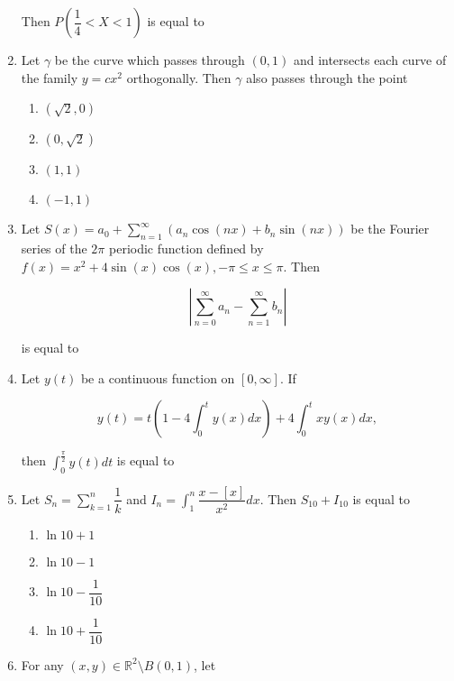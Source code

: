 \documentclass[journal]{IEEEtran}
\newcommand{\brak}[1]{\left( #1 \right)}
\newcommand{\sbrak}[1]{\left[ #1 \right]}
\newcommand{\abs}[1]{\left| #1 \right|}
\newcommand{\lt}{<}
\begin{document}
\begin{enumerate}
    Then $P\brak{\dfrac{1}{4} \lt X \lt 1}$ is equal to \underline{\hspace{2cm}}

\item Let $\gamma$ be the curve which passes through $\brak{0,1}$ and intersects each curve of the family $y = c x^2$ orthogonally. Then $\gamma$ also passes through the point

    \begin{enumerate}
        \item $\brak{\sqrt{2},0}$
        \item $\brak{0,\sqrt{2}}$
        \item $\brak{1,1}$
        \item $\brak{-1,1}$
    \end{enumerate}

\item Let $S\brak{x} = a_0 + \sum_{n=1}^{\infty}\brak{a_n \cos\brak{n x} + b_n \sin\brak{n x}}$ be the Fourier series of the $2 \pi$ periodic function defined by $f\brak{x} = x^2 + 4 \sin\brak{x} \cos\brak{x}, -\pi \le x \le \pi$. Then 

    $$\abs{\sum_{n=0}^{\infty} a_n - \sum_{n=1}^{\infty} b_n}$$

    is equal to \underline{\hspace{2cm}}

\item Let $y\brak{t}$ be a continuous function on $\sbrak{0,\infty}$. If

    $$y\brak{t} = t\brak{1 - 4\int_{0}^{t}y\brak{x}dx} + 4\int_{0}^{t}x y\brak{x}dx,$$

    then $\int_{0}^\frac{\pi}{2} y\brak{t} dt$ is equal to \underline{\hspace{2cm}}

\item Let $S_n = \sum_{k=1}^{n} \dfrac{1}{k}$ and $I_n = \int_{1}^{n} \dfrac{x - \sbrak{x}}{x^2} dx$. Then $S_{10} + I_{10}$ is equal to

    \begin{enumerate}
        \item $\ln 10 + 1$
        \item $\ln 10 - 1$
        \item $\ln 10 - \dfrac{1}{10}$
        \item $\ln 10 + \dfrac{1}{10}$
    \end{enumerate}

\item For any $\brak{x,y} \in \mathbb{R}^2 \setminus B\brak{0,1}$, let


\end{enumerate}
\end{document}
